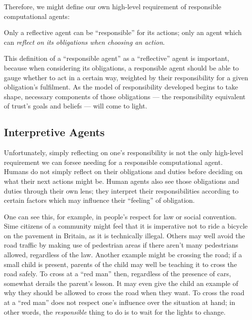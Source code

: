 Therefore, we might define our own high-level requirement of responsible computational agents:

\begin{displayquote}
    Only a reflective agent can be ``responsible'' for its actions; only an agent which can \emph{reflect on its obligations when choosing an action}.
\end{displayquote}\par

This definition of a ``responsible agent'' as a ``reflective'' agent is important, because when considering its obligations, a responsible agent should be able to gauge whether to act in a certain way, weighted by their responsibility for a given obligation's fulfilment. As the model of responsibility developed begins to take shape, necessary components of those obligations --- the responsibility equivalent of trust's goals and beliefs --- will come to light.\par

\subsection{Interpretive Agents}\label{sec:agent_types}
Unfortunately, simply reflecting on one's responsibility is not the only high-level requirement we can forsee needing for a responsible computational agent. Humans do not simply reflect on their obligations and duties before deciding on what their next actions might be. Human agents also see those obligations and duties through their own lens; they interpret their responsibilities according to certain factors which may influence their ``feeling'' of obligation.\par

One can see this, for example, in people's respect for law or social convention. Sime citizens of a community might feel that it is imperative not to ride a bicycle on the pavement in Britain, as it is technically illegal. Others may well avoid the road traffic by making use of pedestrian areas if there aren't many pedestrians allowed, regardless of the law. Another example might be crossing the road; if a small child is present, parents of the child may well be teaching it to cross the road safely. To cross at a ``red man'' then, regardless of the presence of cars, somewhat derails the parent's lesson. It may even give the child an example of why they should be allowed to cross the road when they want. To cross the road at a ``red man'' does not respect one's influence over the situation at hand; in other words, the \emph{responsible} thing to do is to wait for the lights to change.\par

